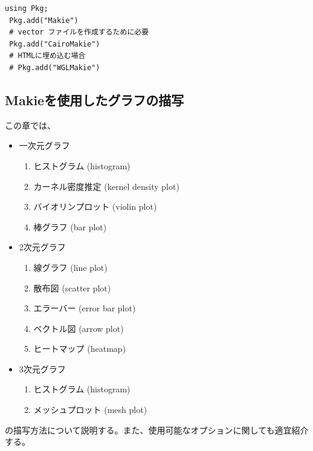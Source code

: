 \documentclass[11pt,dvipdfmx,b5paper,oneside]{jsbook}
\begin{document}
\begin{lstlisting}[title =Makieのインストール, label=installMakie]
 using Pkg;
 Pkg.add("Makie")
 # vector ファイルを作成するために必要
 Pkg.add("CairoMakie")
 # HTMLに埋め込む場合
 # Pkg.add("WGLMakie")
\end{lstlisting}

\subsection{Makieを使用したグラフの描写}
この章では、
\begin{itemize}
 \item 一次元グラフ
 \begin{enumerate}
  \item ヒストグラム (histogram)
  \item カーネル密度推定 (kernel density plot)
  \item バイオリンプロット (violin plot)
  \item 棒グラフ (bar plot)
 \end{enumerate}
 \item 2次元グラフ
\begin{enumerate}
 \item 線グラフ (line plot)
 \item 散布図 (scatter plot)
 \item エラーバー (error bar plot)
 \item ベクトル図 (arrow plot)
 \item ヒートマップ (heatmap)
\end{enumerate}
\item 3次元グラフ
\begin{enumerate}
 \item ヒストグラム (histogram)
 \item メッシュプロット (mesh plot)
\end{enumerate}
\end{itemize}
の描写方法について説明する。また、使用可能なオプションに関しても適宜紹介する。
\end{document}
